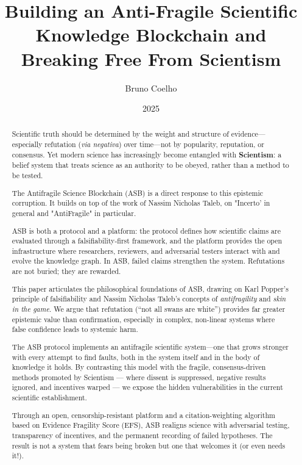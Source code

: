 \documentclass{article}
\title{Building an Anti-Fragile Scientific Knowledge Blockchain and Breaking Free From Scientism}
\author{Bruno Coelho}
\date{2025}
\begin{document}
\maketitle

\clearpage
\tableofcontents
\clearpage

\begin{abstract}
Scientific truth should be determined by the weight and structure of evidence—especially refutation (\emph{via negativa}) over time—not by popularity, reputation, or consensus. Yet modern science has increasingly become entangled with \textbf{Scientism}: a belief system that treats science as an authority to be obeyed, rather than a method to be tested.

The Antifragile Science Blockchain (ASB) is a direct response to this epistemic corruption. It builds on top of the work of Nassim Nicholas Taleb, on "Incerto' in general and "AntiFragile" in particular. 

ASB is both a protocol and a platform: the protocol defines how scientific claims are evaluated through a falsifiability-first framework, and the platform provides the open infrastructure where researchers, reviewers, and adversarial testers interact with and evolve the knowledge graph. In ASB, failed claims strengthen the system. Refutations are not buried; they are rewarded.

This paper articulates the philosophical foundations of ASB, drawing on Karl Popper's principle of falsifiability and Nassim Nicholas Taleb's concepts of \emph{antifragility} and \emph{skin in the game}. We argue that refutation (“not all swans are white”) provides far greater epistemic value than confirmation, especially in complex, non-linear systems where false confidence leads to systemic harm.

The ASB protocol implements an antifragile scientific system—one that grows stronger with every attempt to find faults, both in the system itself and in the body of knowledge it holds. By contrasting this model with the fragile, consensus-driven methods promoted by Scientism — where dissent is suppressed, negative results ignored, and incentives warped — we expose the hidden vulnerabilities in the current scientific establishment.

Through an open, censorship-resistant platform and a citation-weighting algorithm based on Evidence Fragility Score (EFS), ASB realigns science with adversarial testing, transparency of incentives, and the permanent recording of failed hypotheses. The result is not a system that fears being broken but one that welcomes it (or even needs it!).

\end{abstract}
\end{document}
